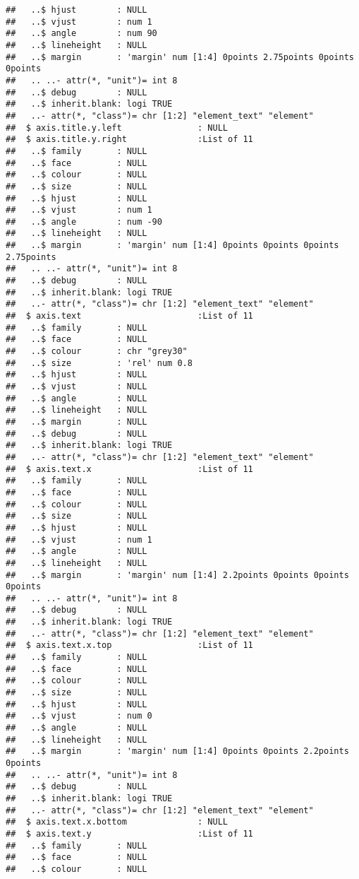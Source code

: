\documentclass[
]{article}
\begin{document}
\begin{verbatim}
##   ..$ hjust        : NULL
##   ..$ vjust        : num 1
##   ..$ angle        : num 90
##   ..$ lineheight   : NULL
##   ..$ margin       : 'margin' num [1:4] 0points 2.75points 0points 0points
##   .. ..- attr(*, "unit")= int 8
##   ..$ debug        : NULL
##   ..$ inherit.blank: logi TRUE
##   ..- attr(*, "class")= chr [1:2] "element_text" "element"
##  $ axis.title.y.left               : NULL
##  $ axis.title.y.right              :List of 11
##   ..$ family       : NULL
##   ..$ face         : NULL
##   ..$ colour       : NULL
##   ..$ size         : NULL
##   ..$ hjust        : NULL
##   ..$ vjust        : num 1
##   ..$ angle        : num -90
##   ..$ lineheight   : NULL
##   ..$ margin       : 'margin' num [1:4] 0points 0points 0points 2.75points
##   .. ..- attr(*, "unit")= int 8
##   ..$ debug        : NULL
##   ..$ inherit.blank: logi TRUE
##   ..- attr(*, "class")= chr [1:2] "element_text" "element"
##  $ axis.text                       :List of 11
##   ..$ family       : NULL
##   ..$ face         : NULL
##   ..$ colour       : chr "grey30"
##   ..$ size         : 'rel' num 0.8
##   ..$ hjust        : NULL
##   ..$ vjust        : NULL
##   ..$ angle        : NULL
##   ..$ lineheight   : NULL
##   ..$ margin       : NULL
##   ..$ debug        : NULL
##   ..$ inherit.blank: logi TRUE
##   ..- attr(*, "class")= chr [1:2] "element_text" "element"
##  $ axis.text.x                     :List of 11
##   ..$ family       : NULL
##   ..$ face         : NULL
##   ..$ colour       : NULL
##   ..$ size         : NULL
##   ..$ hjust        : NULL
##   ..$ vjust        : num 1
##   ..$ angle        : NULL
##   ..$ lineheight   : NULL
##   ..$ margin       : 'margin' num [1:4] 2.2points 0points 0points 0points
##   .. ..- attr(*, "unit")= int 8
##   ..$ debug        : NULL
##   ..$ inherit.blank: logi TRUE
##   ..- attr(*, "class")= chr [1:2] "element_text" "element"
##  $ axis.text.x.top                 :List of 11
##   ..$ family       : NULL
##   ..$ face         : NULL
##   ..$ colour       : NULL
##   ..$ size         : NULL
##   ..$ hjust        : NULL
##   ..$ vjust        : num 0
##   ..$ angle        : NULL
##   ..$ lineheight   : NULL
##   ..$ margin       : 'margin' num [1:4] 0points 0points 2.2points 0points
##   .. ..- attr(*, "unit")= int 8
##   ..$ debug        : NULL
##   ..$ inherit.blank: logi TRUE
##   ..- attr(*, "class")= chr [1:2] "element_text" "element"
##  $ axis.text.x.bottom              : NULL
##  $ axis.text.y                     :List of 11
##   ..$ family       : NULL
##   ..$ face         : NULL
##   ..$ colour       : NULL

\end{verbatim}
\end{document}
